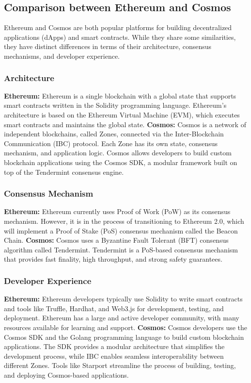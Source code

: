\documentclass{article}
\begin{document}
\subsection{Comparison between Ethereum and Cosmos}
%
Ethereum and Cosmos are both popular platforms for building decentralized applications (dApps) and smart contracts. While they share some similarities, they have distinct differences in terms of their architecture, consensus mechanisms, and developer experience.
%
\subsubsection{Architecture}
%
\textbf{Ethereum:} Ethereum is a single blockchain with a global state that supports smart contracts written in the Solidity programming language. Ethereum's architecture is based on the Ethereum Virtual Machine (EVM), which executes smart contracts and maintains the global state.
%
\textbf{Cosmos:} Cosmos is a network of independent blockchains, called Zones, connected via the Inter-Blockchain Communication (IBC) protocol. Each Zone has its own state, consensus mechanism, and application logic. Cosmos allows developers to build custom blockchain applications using the Cosmos SDK, a modular framework built on top of the Tendermint consensus engine.
%
\subsubsection{Consensus Mechanism}
%
\textbf{Ethereum:} Ethereum currently uses Proof of Work (PoW) as its consensus mechanism. However, it is in the process of transitioning to Ethereum 2.0, which will implement a Proof of Stake (PoS) consensus mechanism called the Beacon Chain.
%
\textbf{Cosmos:} Cosmos uses a Byzantine Fault Tolerant (BFT) consensus algorithm called Tendermint. Tendermint is a PoS-based consensus mechanism that provides fast finality, high throughput, and strong safety guarantees.
%
\subsubsection{Developer Experience}
%
\textbf{Ethereum:} Ethereum developers typically use Solidity to write smart contracts and tools like Truffle, Hardhat, and Web3.js for development, testing, and deployment. Ethereum has a large and active developer community, with many resources available for learning and support.
%
\textbf{Cosmos:} Cosmos developers use the Cosmos SDK and the Golang programming language to build custom blockchain applications. The SDK provides a modular architecture that simplifies the development process, while IBC enables seamless interoperability between different Zones. Tools like Starport streamline the process of building, testing, and deploying Cosmos-based applications.
%
\end{document}
